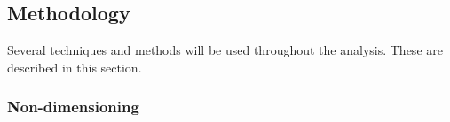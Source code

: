 %
%
%
%
%
%

\subsection{Methodology}

Several techniques and methods will be used throughout the analysis. These are described in this section.


\subsubsection{Non-dimensioning}

